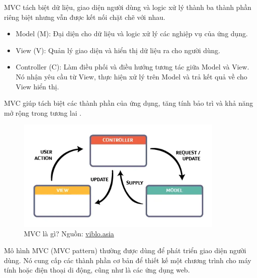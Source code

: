 MVC tách biệt dữ liệu, giao diện người dùng và logic xử lý thành ba thành phần riêng biệt nhưng vẫn được kết nối chặt chẽ với nhau.

\begin{itemize}
	\item Model (M): Đại diện cho dữ liệu và logic xử lý các nghiệp vụ của ứng dụng.
	\item View (V): Quản lý giao diện và hiển thị dữ liệu ra cho người dùng.
	\item Controller (C): Làm điều phối và điều hướng tương tác giữa Model và View. Nó nhận yêu cầu từ View, thực hiện xử lý trên Model và trả kết quả về cho View hiển thị.
\end{itemize}

MVC giúp tách biệt các thành phần của ứng dụng, tăng tính bảo trì và khả năng mở rộng trong tương lai \cite{MVC}.

\begin{figure}[H]
	\centering
	\includegraphics[width=10cm]{Images/ezgif-4-c53032b3fd.png}
	\vspace{0.5cm}
	\caption{MVC là gì? Nguồn: \href{https://viblo.asia/p/ios-mot-so-cach-co-ban-de-truyen-du-lieu-tu-model-toi-controller-trong-mo-hinh-mvc-L4x5xNWqZBM}{viblo.asia}}
	\label{fig:my_label}
\end{figure}

Mô hình MVC (MVC pattern) thường được dùng để phát triển giao diện người dùng. Nó cung cấp các thành phần cơ bản để thiết kế một chương trình cho máy tính hoặc điện thoại di động, cũng như là các ứng dụng web.

